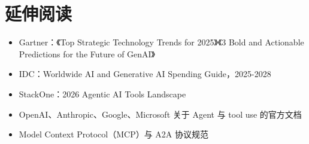 \section{延伸阅读}

\begin{itemize}[leftmargin=2em]
\item Gartner：《Top Strategic Technology Trends for 2025》《3 Bold and Actionable Predictions for the Future of GenAI》
\item IDC：Worldwide AI and Generative AI Spending Guide，2025-2028
\item StackOne：2026 Agentic AI Tools Landscape
\item OpenAI、Anthropic、Google、Microsoft 关于 Agent 与 tool use 的官方文档
\item Model Context Protocol（MCP）与 A2A 协议规范
\end{itemize}
